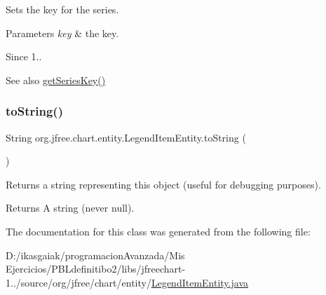 Sets the key for the series.


\begin{DoxyParams}{Parameters}
{\em key} & the key.\\
\hline
\end{DoxyParams}
\begin{DoxySince}{Since}
1..
\end{DoxySince}
\begin{DoxySeeAlso}{See also}
\mbox{\hyperlink{classorg_1_1jfree_1_1chart_1_1entity_1_1_legend_item_entity_adcd94e383c12091bc60065e4f73bac2a}{get\+Series\+Key()}} 
\end{DoxySeeAlso}
\mbox{\label{classorg_1_1jfree_1_1chart_1_1entity_1_1_legend_item_entity_aef49c4970cac678742659a28c6792d71}} 
\subsubsection{\texorpdfstring{to\+String()}{toString()}}
{\footnotesize\ttfamily String org.\+jfree.\+chart.\+entity.\+Legend\+Item\+Entity.\+to\+String (\begin{DoxyParamCaption}{ }\end{DoxyParamCaption})}

Returns a string representing this object (useful for debugging purposes).

\begin{DoxyReturn}{Returns}
A string (never {\ttfamily null}). 
\end{DoxyReturn}


The documentation for this class was generated from the following file\+:\begin{DoxyCompactItemize}
\item 
D\+:/ikasgaiak/programacion\+Avanzada/\+Mis Ejercicios/\+P\+B\+Ldefinitibo2/libs/jfreechart-\/1../source/org/jfree/chart/entity/\mbox{\hyperlink{_legend_item_entity_8java}{Legend\+Item\+Entity.\+java}}\end{DoxyCompactItemize}
